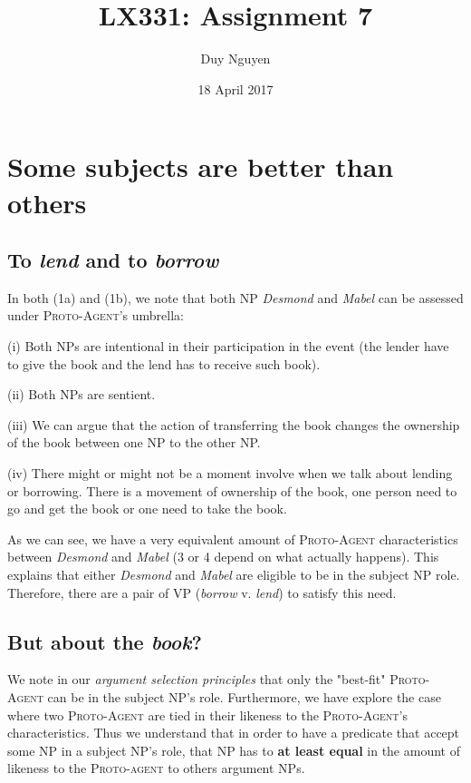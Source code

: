 \documentclass{article}
\title{LX331: Assignment 7}
\author{Duy Nguyen}
\date{18 April 2017}
\begin{document}
\maketitle
\newcommand*{\msim}{\mathord{\sim}}
\newcommand*{\mand}{\mathbin{\&}}

\section{Some subjects are better than others}
\subsection{To \textit{lend} and to \textit{borrow}}
In both (1a) and (1b), we note that both NP \textit{Desmond} and \textit{Mabel} can be assessed under \textsc{Proto-Agent}'s umbrella:

(i) Both NPs are intentional in their participation in the event (the lender have to give the book and the lend has to receive such book). 

(ii) Both NPs are sentient.

(iii) We can argue that the action of transferring the book changes the ownership of the book between one NP to the other NP. 

(iv) There might or might not be a moment involve when we talk about lending or borrowing. There is a movement of ownership of the book, one person need to go and get the book or one need to take the book. 

As we can see, we have a very equivalent amount of \textsc{Proto-Agent} characteristics between \textit{Desmond} and \textit{Mabel} (3 or 4 depend on what actually happens). This explains that either \textit{Desmond} and \textit{Mabel} are eligible to be in the subject NP role. Therefore, there are a pair of VP (\textit{borrow} v. \textit{lend}) to satisfy this need.  

\subsection{But about the \textit{book}?}
We note in our \textit{argument selection principles} that only the "best-fit" \textsc{Proto-Agent} can be in the subject NP's role. Furthermore, we have explore the case where two \textsc{Proto-Agent} are tied in their likeness to the \textsc{Proto-Agent}'s characteristics. Thus we understand that in order to have a predicate that accept some NP in a subject NP's role, that NP has to \textbf{at least equal} in the amount of likeness to the \textsc{Proto-agent} to others argument NPs.
\end{document}
